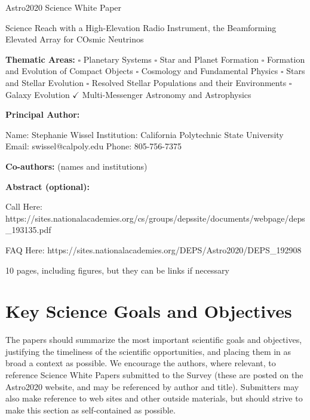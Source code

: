 \documentclass[12pt]{article}
\begin{document}
\raggedright
\huge
Astro2020 Science White Paper \linebreak

Science Reach with a High-Elevation Radio Instrument, the Beamforming Elevated Array for COsmic Neutrinos \linebreak
\normalsize

\noindent \textbf{Thematic Areas:} \hspace*{60pt} $\square$ Planetary Systems \hspace*{10pt} $\square$ Star and Planet Formation \hspace*{20pt}\linebreak
$\square$ Formation and Evolution of Compact Objects \hspace*{31pt} $\square$ Cosmology and Fundamental Physics \linebreak
  $\square$  Stars and Stellar Evolution \hspace*{1pt} $\square$ Resolved Stellar Populations and their Environments \hspace*{40pt} \linebreak
  $\square$    Galaxy Evolution   \hspace*{45pt} $\checkmark$             Multi-Messenger Astronomy and Astrophysics \hspace*{65pt} \linebreak
  
\textbf{Principal Author:}

Name:	Stephanie Wissel
 \linebreak						
Institution:  California Polytechnic State University
 \linebreak
Email: swissel@calpoly.edu
 \linebreak
Phone:  805-756-7375
 \linebreak
 
\textbf{Co-authors:} (names and institutions)
  \linebreak

\textbf{Abstract  (optional):}


\pagebreak

Call Here:
https://sites.nationalacademies.org/cs/groups/depssite/documents/webpage/deps\_193135.pdf

FAQ Here: 
https://sites.nationalacademies.org/DEPS/Astro2020/DEPS\_192908

10 pages, including figures, but they can be links if necessary

\section{Key Science Goals and Objectives}
\color{blue}
The papers should summarize the most important scientific goals and objectives, justifying the timeliness of the scientific opportunities, and placing them in as broad a context as possible. We encourage the authors, where relevant, to reference Science White Papers submitted to the Survey (these are posted on the Astro2020 website, and may be referenced by author and title). Submitters may also make reference to web sites and other outside materials, but should strive to make this section as self-contained as possible.
\color{black}
\end{document}
